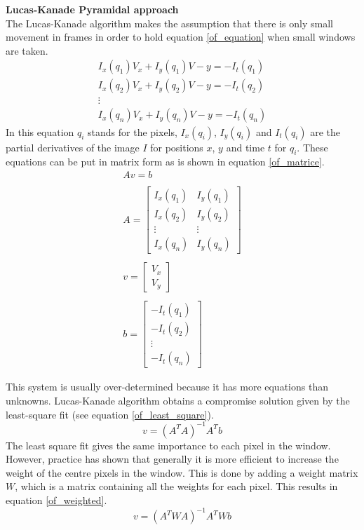 \documentclass[a4paper]{article}
\begin{document}
\noindent\textbf{Lucas-Kanade Pyramidal approach}\\
The Lucas-Kanade \cite{Bouguet2000} algorithm makes the assumption that there is only small movement in frames in order to hold equation \ref{of_equation} when small windows are taken.
\begin{equation}
\label{of_equation}
\begin{matrix}
I_x(q_1)V_x + I_y(q_1)V - y = -I_t(q_1)\\
I_x(q_2)V_x + I_y(q_2)V - y = -I_t(q_2)\\
\vdots\\
I_x(q_n)V_x + I_y(q_n)V - y = -I_t(q_n)
\end{matrix}
\end{equation}
In this equation $q_i$ stands for the pixels, $I_x(q_i)$, $I_y(q_i)$ and $I_t(q_i)$ are the partial derivatives of the image $I$ for positions $x$, $y$ and time $t$ for $q_i$. These equations can be put in matrix form as is shown in equation \ref{of_matrice}.
\begin{equation}
\label{of_matrice}
\begin{matrix}
Av = b\\\\
A = \begin{bmatrix}
I_x(q_1) & I_y(q_1)\\
I_x(q_2) & I_y(q_2)\\
\vdots & \vdots\\
I_x(q_n) & I_y(q_n)
\end{bmatrix}\\\\
v = \begin{bmatrix}
V_x\\
V_y
\end{bmatrix}\\\\
b = \begin{bmatrix}
-I_t(q_1)\\
-I_t(q_2)\\
\vdots\\
-I_t(q_n)
\end{bmatrix}

\end{matrix}
\end{equation}

This system is usually over-determined because it has more equations than unknowns. Lucas-Kanade algorithm obtains a compromise solution given by the least-square fit (see equation \ref{of_least_square}).
\begin{equation}
\label{of_least_square}
v = (A^T A)^{-1} A^T b
\end{equation}
The least square fit gives the same importance to each pixel in the window. However, practice has shown that generally it is more efficient to increase the weight of the centre pixels in the window. This is done by adding a weight matrix $W$, which is a matrix containing all the weights for each pixel. This results in equation \ref{of_weighted}.
\begin{equation}
\label{of_weighted}
v = (A^T W A)^{-1} A^T W b
\end{equation}
\end{document}
